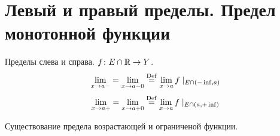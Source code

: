 \section{Левый и правый пределы. Предел монотонной функции}

\begin{Def}
Пределы слева и справа. $f\colon E \cap \mathbb{R} \rightarrow Y$.
$$\lim\limits_{x\rightarrow a-} = \lim\limits_{x\rightarrow a-0} \stackrel{\mathrm{Def}}{=} \lim\limits_{x\rightarrow a} f\mid_{E\cap(-\inf,a)}$$
$$\lim\limits_{x\rightarrow a+} = \lim\limits_{x\rightarrow a+0} \stackrel{\mathrm{Def}}{=} \lim\limits_{x\rightarrow a} f\mid_{E\cap(a,+\inf)}$$
\end{Def}

\begin{theorem}{Существование предела возрастающей и ограниченой функции.}

\end{theorem}
